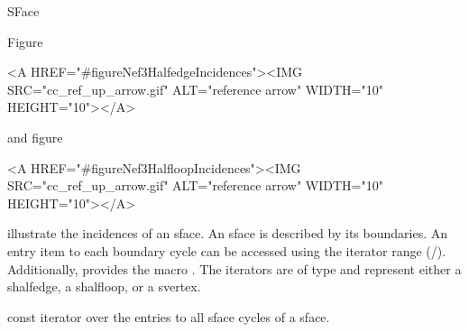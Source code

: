 
\ccRefPageBegin



\begin{ccRefClass}{SFace}

\ccDefinition

Figure~\begin{ccHtmlOnly}
  <A HREF="#figureNef3HalfedgeIncidences"><IMG 
  SRC="cc_ref_up_arrow.gif" ALT="reference arrow" WIDTH="10" HEIGHT="10"></A>
\end{ccHtmlOnly} and
figure~\begin{ccHtmlOnly}
  <A HREF="#figureNef3HalfloopIncidences"><IMG 
  SRC="cc_ref_up_arrow.gif" ALT="reference arrow" WIDTH="10" HEIGHT="10"></A>
\end{ccHtmlOnly} illustrate the incidences of an sface. An sface is described
by its boundaries. An entry item to each boundary cycle can be accessed
using the iterator range (/).
Additionally,  provides the macro 
. The iterators are of type 
 and represent either a shalfedge, a shalfloop,
or a svertex.




\ccTypes
{}
\ccThreeToTwo



\ccGlue
{}
\ccGlue
{}
\ccGlue
{}
{const iterator over the entries to all sface cycles of a sface.}


\end{ccRefClass}
